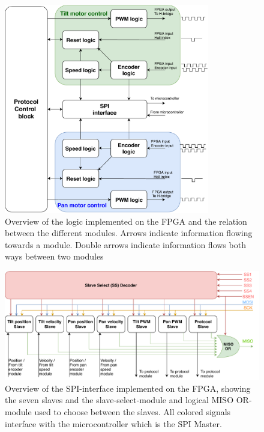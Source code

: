 \documentclass[../../main.tex]{subfiles}
\begin{document}
\begin{figure}
    \centering
    \includegraphics[width=0.8\textwidth]{Sections/System_Implementation/Images/FPGALogicBothMotors.pdf}
    \caption{Overview of the logic implemented on the FPGA and the relation between the different modules. Arrows indicate information flowing towards a module. Double arrows indicate information flows both ways between two modules}
    \label{fig:FPGALogicBothMotors}
\end{figure}

\begin{figure}[H]
    \centering
    \includegraphics[width=\textwidth]{Sections/System_Implementation/Images/SPILogicSimple.pdf}
    \caption{Overview of the SPI-interface implemented on the FPGA, showing the seven slaves and the slave-select-module and logical MISO OR-module used to choose between the slaves. All colored signals interface with the microcontroller which is the SPI Master. } %
    \label{fig:SPILogicSimple}
\end{figure}
\end{document}
